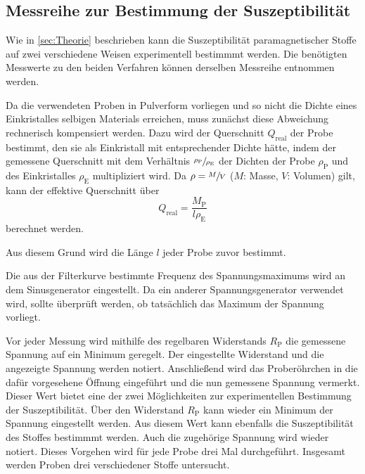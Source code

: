 \subsection{Messreihe zur Bestimmung der Suszeptibilität}
\label{subsec:D_Suszeptibilität}
Wie in \autoref{sec:Theorie} beschrieben kann die Suszeptibilität paramagnetischer Stoffe auf zwei verschiedene Weisen experimentell bestimmmt werden. 
Die benötigten Messwerte zu den beiden Verfahren können derselben Messreihe entnommen werden. 

Da die verwendeten Proben in Pulverform vorliegen und so nicht die Dichte eines Einkristalles selbigen Materials erreichen, muss zunächst diese Abweichung
rechnerisch kompensiert werden. Dazu wird der Querschnitt $Q_\text{real}$ der Probe bestimmt, den sie als Einkristall mit entsprechender Dichte hätte,
indem der gemessene Querschnitt mit dem Verhältnis $\sfrac{\rho_\text{P}}{\rho_\text{E}}$ der Dichten der Probe $\rho_\text{P}$ und des Einkristalles $\rho_\text{E}$ 
multipliziert wird. Da $\rho = \sfrac{M}{V}$ ($M$: Masse, $V$: Volumen) gilt, kann der effektive Querschnitt über
\begin{equation}
    \label{eqn:Q_real}
    Q_\text{real} = \frac{M_\text{P}}{l \rho_\text{E}}
\end{equation}
berechnet werden.

Aus diesem Grund wird die Länge $l$ jeder Probe zuvor bestimmt. 

Die aus der Filterkurve bestimmte Frequenz des Spannungsmaximums wird an dem Sinusgenerator eingestellt. Da ein anderer Spannungsgenerator verwendet wird, sollte 
überprüft werden, ob tatsächlich das Maximum der Spannung vorliegt.

Vor jeder Messung wird mithilfe des regelbaren Widerstands $R_\text{P}$ die gemessene Spannung auf ein Minimum geregelt. Der eingestellte Widerstand und die angezeigte 
Spannung werden notiert. Anschließend wird das Proberöhrchen in die dafür vorgesehene Öffnung eingeführt und die nun gemessene Spannung vermerkt. 
Dieser Wert bietet eine der zwei Möglichkeiten zur experimentellen Bestimmung der Suszeptibilität. Über den Widerstand $R_\text{P}$ kann wieder ein Minimum der Spannung
eingestellt werden. Aus diesem Wert kann ebenfalls die Suszeptibilität des Stoffes bestimmmt werden. Auch die zugehörige Spannung wird wieder notiert.
Dieses Vorgehen wird für jede Probe drei Mal durchgeführt. Insgesamt werden Proben drei verschiedener Stoffe untersucht.  

